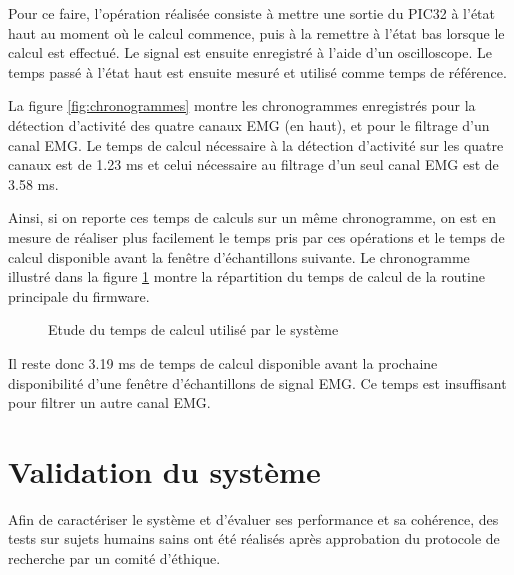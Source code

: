 \documentclass[letterpaper, twoside, 12pt, memoire, creativecommons, hyperref]{thETS}
\begin{document}
Pour ce faire, l'opération réalisée consiste à mettre une sortie du PIC32 à l'état haut au moment où le calcul commence, puis à la remettre à l'état bas lorsque le calcul est effectué. Le signal est ensuite enregistré à l'aide d'un oscilloscope. Le temps passé à l'état haut est ensuite mesuré et utilisé comme temps de référence. 

La figure \ref{fig:chronogrammes} montre les chronogrammes enregistrés pour la détection d'activité des quatre canaux EMG (en haut), et pour le filtrage d'un canal EMG. Le temps de calcul nécessaire à la détection d'activité sur les quatre canaux est de 1.23 ms et celui nécessaire au filtrage d'un seul canal EMG est de 3.58 ms.

Ainsi, si on reporte ces temps de calculs sur un même chronogramme, on est en mesure de réaliser plus facilement le temps pris par ces opérations et le temps de calcul disponible avant la fenêtre d'échantillons suivante. Le chronogramme illustré dans la figure \ref{fig:chronogrammeDisc} montre la répartition du temps de calcul de la routine principale du firmware. 

\begin{figure}
	\centering
	\caption{Etude du temps de calcul utilisé par le système}
	\label{fig:chronogrammeDisc}
\end{figure}

Il reste donc 3.19 ms de temps de calcul disponible avant la prochaine disponibilité d'une fenêtre d'échantillons de signal EMG. Ce temps est insuffisant pour filtrer un autre canal EMG.

\section{Validation du système}

Afin de caractériser le système et d'évaluer ses performance et sa cohérence, des tests sur sujets humains sains ont été réalisés après approbation du protocole de recherche par un comité d'éthique. 
\end{document}
